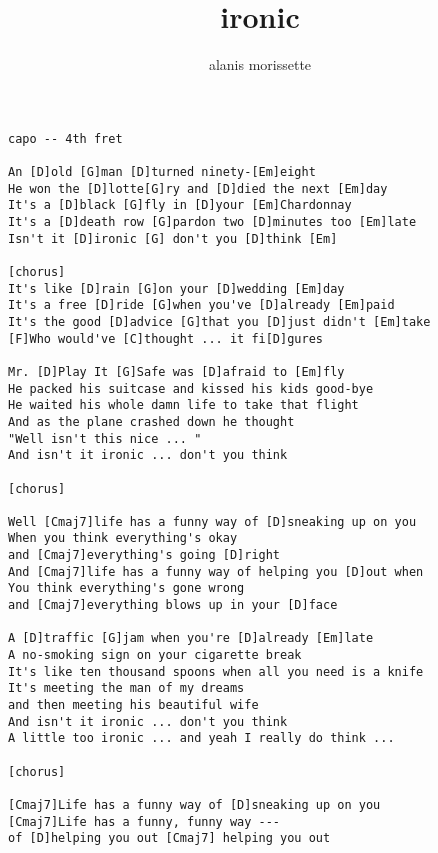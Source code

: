 \author{alanis morissette}
\title{ironic}
\maketitle
\begin{verbatim}
capo -- 4th fret

An [D]old [G]man [D]turned ninety-[Em]eight   
He won the [D]lotte[G]ry and [D]died the next [Em]day
It's a [D]black [G]fly in [D]your [Em]Chardonnay
It's a [D]death row [G]pardon two [D]minutes too [Em]late
Isn't it [D]ironic [G] don't you [D]think [Em]

[chorus]
It's like [D]rain [G]on your [D]wedding [Em]day
It's a free [D]ride [G]when you've [D]already [Em]paid
It's the good [D]advice [G]that you [D]just didn't [Em]take
[F]Who would've [C]thought ... it fi[D]gures 

Mr. [D]Play It [G]Safe was [D]afraid to [Em]fly
He packed his suitcase and kissed his kids good-bye
He waited his whole damn life to take that flight
And as the plane crashed down he thought
"Well isn't this nice ... "
And isn't it ironic ... don't you think 

[chorus]

Well [Cmaj7]life has a funny way of [D]sneaking up on you
When you think everything's okay
and [Cmaj7]everything's going [D]right 
And [Cmaj7]life has a funny way of helping you [D]out when
You think everything's gone wrong
and [Cmaj7]everything blows up in your [D]face

A [D]traffic [G]jam when you're [D]already [Em]late
A no-smoking sign on your cigarette break
It's like ten thousand spoons when all you need is a knife
It's meeting the man of my dreams
and then meeting his beautiful wife
And isn't it ironic ... don't you think
A little too ironic ... and yeah I really do think ...

[chorus]

[Cmaj7]Life has a funny way of [D]sneaking up on you
[Cmaj7]Life has a funny, funny way ---
of [D]helping you out [Cmaj7] helping you out
\end{verbatim}